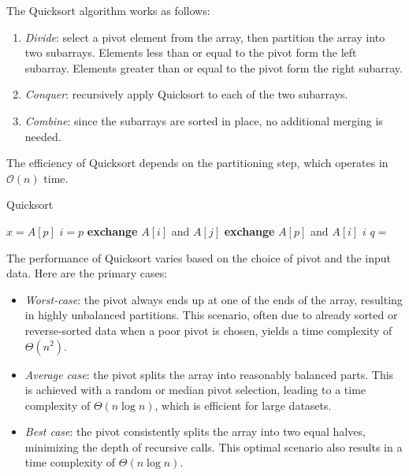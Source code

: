 The Quicksort algorithm works as follows:
\begin{enumerate}
    \item \textit{Divide}: select a pivot element from the array, then partition the array into two subarrays. 
        Elements less than or equal to the pivot form the left subarray.
        Elements greater than or equal to the pivot form the right subarray.
    \item \textit{Conquer}: recursively apply Quicksort to each of the two subarrays.
    \item \textit{Combine}: since the subarrays are sorted in place, no additional merging is needed.
\end{enumerate}
The efficiency of Quicksort depends on the partitioning step, which operates in $\mathcal{O}(n)$ time. 
\begin{algorithm}[H]
    \caption{Quicksort}
    \begin{algorithmic}[1]
            \State $x=A[p]$
            \State $i=p$
                    \State \textbf{exchange }$A[i]$ and $A[j]$
                \EndIf
            \EndFor
            \State \textbf{exchange }$A[p]$ and $A[i]$
            \State \Return $i$
        \EndFunction
        \Statex
                \State $q=$ 
                \State {}
                \State {}
            \EndIf
        \EndProcedure
    \end{algorithmic}
\end{algorithm}  
The performance of Quicksort varies based on the choice of pivot and the input data. 
Here are the primary cases:
\begin{itemize}
    \item \textit{Worst-case}: the pivot always ends up at one of the ends of the array, resulting in highly unbalanced partitions.
        This scenario, often due to already sorted or reverse-sorted data when a poor pivot is chosen, yields a time complexity of $\Theta(n^2)$.
    \item \textit{Average case}:  the pivot splits the array into reasonably balanced parts.
        This is achieved with a random or median pivot selection, leading to a time complexity of $\Theta(n \log n)$, which is efficient for large datasets.
    \item \textit{Best case}: the pivot consistently splits the array into two equal halves, minimizing the depth of recursive calls. 
        This optimal scenario also results in a time complexity of $\Theta(n \log n)$.
\end{itemize}

